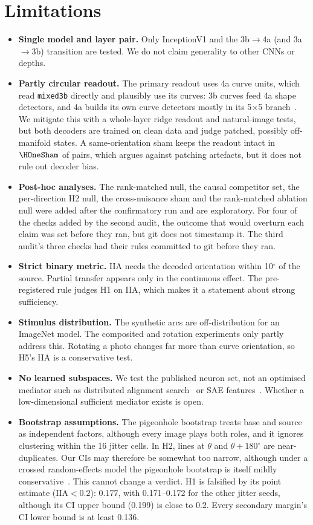 \documentclass[11pt]{article}
\newcommand{\iia}{\mathrm{IIA}}
\begin{document}
\section{Limitations}
\begin{itemize}
\item \textbf{Single model and layer pair.} Only InceptionV1 and the 3b$\to$4a (and 3a$\to$3b) transition are tested. We do not claim generality to other CNNs or depths.
\item \textbf{Partly circular readout.} The primary readout uses 4a curve units, which read \texttt{mixed3b} directly and plausibly use its curves: 3b curves feed 4a shape detectors, and 4a builds its own curve detectors mostly in its 5$\times$5 branch~\cite{cammarata2021circuits}. We mitigate this with a whole-layer ridge readout and natural-image tests, but both decoders are trained on clean data and judge patched, possibly off-manifold states. A same-orientation sham keeps the readout intact in $\HOneSham$ of pairs, which argues against patching artefacts, but it does not rule out decoder bias.
\item \textbf{Post-hoc analyses.} The rank-matched null, the causal competitor set, the per-direction H2 null, the cross-nuisance sham and the rank-matched ablation null were added after the confirmatory run and are exploratory. For four of the checks added by the second audit, the outcome that would overturn each claim was set before they ran, but git does not timestamp it. The third audit's three checks had their rules committed to git before they ran.
\item \textbf{Strict binary metric.} IIA needs the decoded orientation within 10$^\circ$ of the source. Partial transfer appears only in the continuous effect. The pre-registered rule judges H1 on IIA, which makes it a statement about strong sufficiency.
\item \textbf{Stimulus distribution.} The synthetic arcs are off-distribution for an ImageNet model. The composited and rotation experiments only partly address this. Rotating a photo changes far more than curve orientation, so H5's IIA is a conservative test.
\item \textbf{No learned subspaces.} We test the published neuron set, not an optimised mediator such as distributed alignment search~\cite{geiger2024das} or SAE features~\cite{gorton2024missing}. Whether a low-dimensional sufficient mediator exists is open.
\item \textbf{Bootstrap assumptions.} The pigeonhole bootstrap treats base and source as independent factors, although every image plays both roles, and it ignores clustering within the 16 jitter cells. In H2, lines at $\theta$ and $\theta+180^\circ$ are near-duplicates. Our CIs may therefore be somewhat too narrow, although under a crossed random-effects model the pigeonhole bootstrap is itself mildly conservative~\cite{owen2007pigeonhole}. This cannot change a verdict. H1 is falsified by its point estimate ($\iia<0.2$): 0.177, with 0.171--0.172 for the other jitter seeds, although its CI upper bound (0.199) is close to 0.2. Every secondary margin's CI lower bound is at least 0.136.

\end{itemize}
\end{document}
